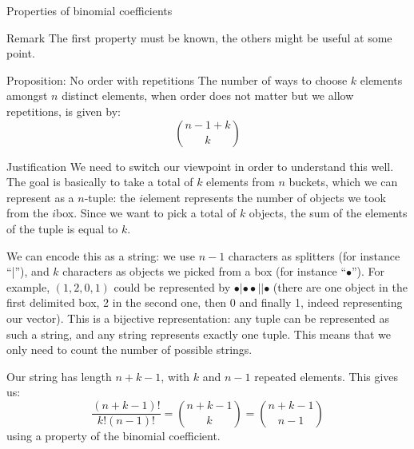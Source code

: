 \documentclass[a4paper]{article}
\begin{document}
\begin{parag}{Properties of binomial coefficients}
    \begin{subparag}{Remark}
        The first property must be known, the others might be useful at some point.
    \end{subparag}
\end{parag}

\begin{parag}{Proposition: No order with repetitions}
    The number of ways to choose $k$ elements amongst $n$ distinct elements, when order does not matter but we allow repetitions, is given by:
    \[\binom{n-1+k}{k}\]

    \begin{subparag}{Justification}
        We need to switch our viewpoint in order to understand this well. The goal is basically to take a total of $k$ elements from $n$ buckets, which we can represent as a $n$-tuple: the $i$\Th element represents the number of objects we took from the $i$\Th box. Since we want to pick a total of $k$ objects, the sum of the elements of the tuple is equal to $k$. 

        We can encode this as a string: we use $n-1$ characters as splitters (for instance ``|''), and $k$ characters as objects we picked from a box (for instance ``$\bullet$''). For example, $\left(1, 2, 0, 1\right)$ could be represented by $\bullet | \bullet \bullet ||\bullet$ (there are one object in the first delimited box, 2 in the second one, then 0 and finally 1, indeed representing our vector). This is a bijective representation: any tuple can be represented as such a string, and any string represents exactly one tuple. This means that we only need to count the number of possible strings.

        Our string has length $n + k - 1$, with $k$ and $n-1$ repeated elements. This gives us: 
        \[\frac{\left(n+k-1\right)!}{k!\left(n-1\right)!} = \binom{n + k - 1}{k} = \binom{n+k-1}{n-1}\]
        using a property of the binomial coefficient.
    \end{subparag}
\end{parag}
\end{document}
